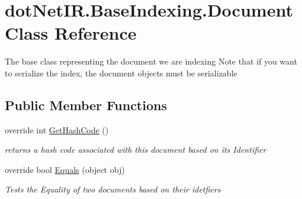\hypertarget{classdot_net_i_r_1_1_base_indexing_1_1_document}{}\section{dot\+Net\+I\+R.\+Base\+Indexing.\+Document Class Reference}
\label{classdot_net_i_r_1_1_base_indexing_1_1_document}


The base class representing the document we are indexing Note that if you want to serialize the index, the document objects must be serializable  


\subsection*{Public Member Functions}
\begin{DoxyCompactItemize}
\item 
override int \hyperlink{classdot_net_i_r_1_1_base_indexing_1_1_document_a12b172751bdbb782c557fabc2a6b9ecb}{Get\+Hash\+Code} ()
\begin{DoxyCompactList}\small\item\em returns a hash code associated with this document based on its Identifier \end{DoxyCompactList}\item 
override bool \hyperlink{classdot_net_i_r_1_1_base_indexing_1_1_document_a30bfe8ab80ad0c37350719da8e571de5}{Equals} (object obj)
\begin{DoxyCompactList}\small\item\em Tests the Equality of two documents based on their idetfiers \end{DoxyCompactList}\end{DoxyCompactItemize}

